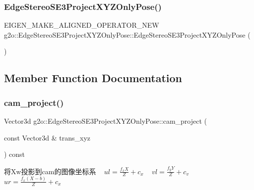 \subsubsection{\texorpdfstring{Edge\+Stereo\+S\+E3\+Project\+X\+Y\+Z\+Only\+Pose()}{EdgeStereoSE3ProjectXYZOnlyPose()}}
{\footnotesize\ttfamily E\+I\+G\+E\+N\+\_\+\+M\+A\+K\+E\+\_\+\+A\+L\+I\+G\+N\+E\+D\+\_\+\+O\+P\+E\+R\+A\+T\+O\+R\+\_\+\+N\+EW g2o\+::\+Edge\+Stereo\+S\+E3\+Project\+X\+Y\+Z\+Only\+Pose\+::\+Edge\+Stereo\+S\+E3\+Project\+X\+Y\+Z\+Only\+Pose (\begin{DoxyParamCaption}{ }\end{DoxyParamCaption})\hspace{0.3cm}{\ttfamily [inline]}}



\subsection{Member Function Documentation}
\mbox{\label{classg2o_1_1_edge_stereo_s_e3_project_x_y_z_only_pose_a6545d86fffb69bb1aa71350fe6d70846}} 
\subsubsection{\texorpdfstring{cam\+\_\+project()}{cam\_project()}}
{\footnotesize\ttfamily Vector3d g2o\+::\+Edge\+Stereo\+S\+E3\+Project\+X\+Y\+Z\+Only\+Pose\+::cam\+\_\+project (\begin{DoxyParamCaption}\item[{const Vector3d \&}]{trans\+\_\+xyz }\end{DoxyParamCaption}) const}

将\+Xw投影到cam的图像坐标系 ~\newline
 $ ul = \frac{f_x X}{Z} + c_x $ ~\newline
 $ vl = \frac{f_y Y}{Z} + c_v $ ~\newline
 $ ur = \frac{f_x (X-b)}{Z} + c_x $ ~\newline

